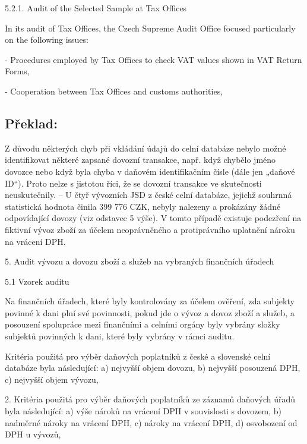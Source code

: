 \documentclass[10pt]{article}
\begin{document}
5.2.1. Audit of the Selected Sample at Tax Offices



In its audit of Tax Offices, the Czech Supreme Audit Office focused particularly on the following issues:



- Procedures employed by Tax Offices to check VAT values shown in VAT Return Forms,



- Cooperation between Tax Offices and customs authorities,



\pagebreak

\subsection*{Překlad:}

Z důvodu některých chyb při vkládání údajů do celní databáze nebylo možné identifikovat některé zapsané dovozní transakce, např. když chybělo jméno dovozce nebo když byla chyba v daňovém identifikačním čísle (dále jen „daňové ID“).
Proto nelze s jistotou říci, že se dovozní transakce ve skutečnosti neuskutečnily.
– U čtyř vývozních JSD z české celní databáze, jejichž souhrnná statistická hodnota činila 399 776 CZK, nebyly nalezeny a prokázány žádné odpovídající dovozy (viz odstavec 5 výše).
V tomto případě existuje podezření na fiktivní vývoz zboží za účelem neoprávněného a protiprávního uplatnění nároku na vrácení DPH.


5. Audit vývozu a dovozu zboží a služeb na vybraných finančních úřadech



5.1 Vzorek auditu

Na finančních úřadech, které byly kontrolovány za účelem ověření, zda subjekty povinné k dani plní své povinnosti, pokud jde o vývoz a dovoz zboží a služeb, a posouzení spolupráce mezi finančními a celními orgány byly vybrány složky subjektů povinných k dani, které byly vybrány v rámci auditu.


Kritéria použitá pro výběr daňových poplatníků z české a slovenské celní databáze byla následující: a) nejvyšší objem dovozu, b) nejvyšší posouzená DPH, c) nejvyšší objem vývozu,



2. Kritéria použitá pro výběr daňových poplatníků ze záznamů daňových úřadů byla následující: a) výše nároků na vrácení DPH v souvislosti s dovozem, b) nadměrné nároky na vrácení DPH, c) nároky na vrácení DPH, d) osvobození od DPH u vývozů,
\end{document}
